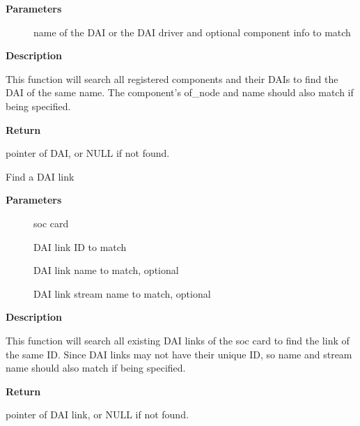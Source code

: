 \documentclass[a4paper,8pt,english]{sphinxmanual}
\begin{document}
\textbf{Parameters}
\begin{description}
\item[{}] \leavevmode
name of the DAI or the DAI driver and optional component info to match

\end{description}

\textbf{Description}

This function will search all registered components and their DAIs to
find the DAI of the same name. The component's of\_node and name
should also match if being specified.

\textbf{Return}

pointer of DAI, or NULL if not found.

\begin{fulllineitems}
\label{sound/kernel-api/alsa-driver-api:c.snd_soc_find_dai_link}
Find a DAI link

\end{fulllineitems}


\textbf{Parameters}
\begin{description}
\item[{}] \leavevmode
soc card

\item[{}] \leavevmode
DAI link ID to match

\item[{}] \leavevmode
DAI link name to match, optional

\item[{}] \leavevmode
DAI link stream name to match, optional

\end{description}

\textbf{Description}

This function will search all existing DAI links of the soc card to
find the link of the same ID. Since DAI links may not have their
unique ID, so name and stream name should also match if being
specified.

\textbf{Return}

pointer of DAI link, or NULL if not found.
\end{document}
